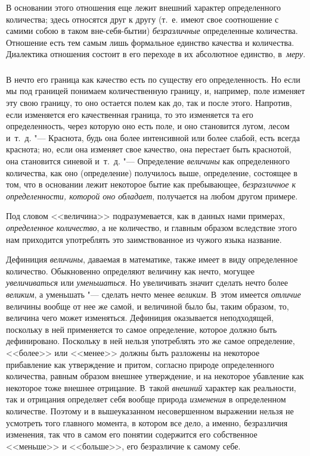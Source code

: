 В основании этого отношения еще лежит внешний характер определенного
количества; здесь относятся друг к другу (т.~е. имеют свое соотношение с
самими собою в таком вне-себя-бытии) {\em безразличные}
определенные количества. Отношение есть тем самым лишь формальное единство
качества и количества. Диалектика отношения состоит в его переходе в их
абсолютное единство, в~{\em меру}.

\subsubsection[Примечание]{}

В нечто его граница как качество есть по существу его определенность. Но
если мы под границей понимаем количественную границу, и, например, поле
изменяет эту свою границу, то оно остается полем как до, так и после этого.
Напротив, если изменяется его качественная граница, то это изменяется та
его определенность, через которую оно есть поле, и оно становится лугом,
лесом и~т.~д. "--- Краснота, будь она более интенсивной или более слабой, есть
всегда краснота; но, если она изменяет свое качество, она перестает быть
краснотой, она становится синевой и~т.~д. "--- Определение
{\em величины} как определенного количества, как оно
(определение) получилось выше, определение, состоящее в том, что в
основании лежит некоторое бытие как пребывающее,
{\em безразличное к определенности, которой оно
обладает}, получается на любом другом примере.

Под словом <<величина>> подразумевается, как в данных нами примерах,
{\em определенное количество}, а не количество, и
главным образом вследствие этого нам приходится употреблять это
заимствованное из чужого языка
название.

Дефиниция {\em величины}, даваемая в математике, также
имеет в виду определенное количество. Обыкновенно определяют величину как
нечто, могущее {\em увеличиваться} или
{\em уменьшаться}. Но увеличивать значит сделать нечто
более {\em великим}, а уменьшать "--- сделать нечто менее {\em великим}.
В~этом имеется {\em отличие} величины вообще от нее же самой, и
величиной было бы, таким образом, то, величина чего может изменяться.
Дефиниция оказывается неподходящей, поскольку в ней применяется то самое
определение, которое должно быть дефинировано. Поскольку в ней нельзя
употреблять это же самое определение, <<более>> или <<менее>> должны быть
разложены на некоторое прибавление как утверждение и притом, согласно
природе определенного количества, равным образом внешнее утверждение, и на
некоторое убавление как некоторое тоже внешнее отрицание. В~такой
{\em внешний} характер как реальности, так и отрицания
определяет себя вообще природа {\em изменения} в
определенном количестве. Поэтому и в вышеуказанном несовершенном выражении
нельзя не усмотреть того главного момента, в котором все дело, а именно,
безразличия изменения, так что в самом его понятии содержится его
собственное <<меньше>> и <<больше>>, его безразличие к самому себе.

